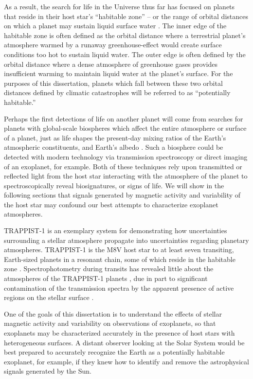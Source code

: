 As a result, the search for life in the Universe thus far has focused on planets that reside in their host star's ``habitable zone'' -- or the range of orbital distances on which a planet may sustain liquid surface water \citep[e.g.][]{Huang1959,Kasting1993,Kopparapu2013}. The inner edge of the habitable zone is often defined as the orbital distance where a terrestrial planet's atmosphere warmed by a runaway greenhouse-effect would create surface conditions too hot to sustain liquid water. The outer edge is often defined by the orbital distance where a dense atmosphere of greenhouse gases provides insufficient warming to maintain liquid water at the planet's surface.
For the purposes of this dissertation, planets which fall between these two orbital distances defined by climatic catastrophes will be referred to as ``potentially habitable.'' 

Perhaps the first detections of life on another planet will come from searches for planets with global-scale biospheres which affect the entire atmosphere or surface of a planet, just as life shapes the present-day mixing ratios of the Earth's atmospheric constituents, and Earth's albedo \citep{Sagan1993}. Such a biosphere could be detected with modern technology via transmission spectroscopy or direct imaging of an exoplanet, for example. Both of these techniques rely upon transmitted or reflected light from the host star interacting with the atmosphere of the planet to spectroscopically reveal biosignatures, or signs of life. We will show in the following sections that signals generated by magnetic activity and variability of the host star may confound our best attempts to characterize exoplanet atmospheres. 

TRAPPIST-1 is an exemplary system for demonstrating how uncertainties surrounding a stellar atmosphere propagate into uncertainties regarding planetary atmospheres. TRAPPIST-1 is the M8V host star to at least seven transiting, Earth-sized planets in a resonant chain, some of which reside in the habitable zone \citep{Gillon2016,Gillon2017,Luger2017}. Spectrophotometry during transits has revealed little about the atmospheres of the TRAPPIST-1 planets \citep{deWit2016, Ducrot2018}, due in part to significant contamination of the transmission spectra by the apparent presence of active regions on the stellar surface \citep{Morris2018c, Zhang2018, Wakeford2019}. 

One of the goals of this dissertation is to understand the effects of stellar magnetic activity and variability on observations of exoplanets, so that exoplanets may be characterized accurately in the presence of host stars with heterogeneous surfaces. A distant observer looking at the Solar System would be best prepared to accurately recognize the Earth as a potentially habitable exoplanet, for example, if they knew how to identify and remove the astrophysical signals generated by the Sun. 

